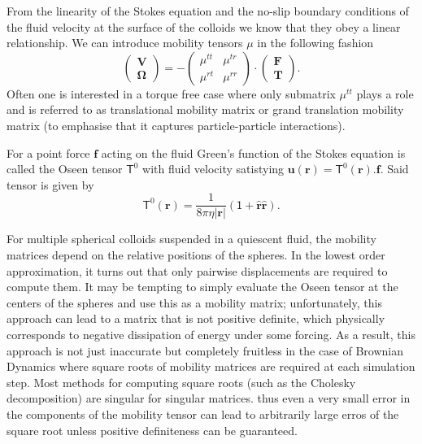 \documentclass{doctoral}
\newcommand{\mm}[1]{\bm{\mathsf{#1}}} %
\begin{document}
From the linearity of the Stokes equation and the no-slip boundary conditions of the fluid velocity at the surface of the colloids we know that they obey a linear relationship.
We can introduce mobility tensors $\mm{\mu}$ in the following fashion
\begin{equation}
    \begin{pmatrix}
        \bm{V} \\
        \bm{\Omega}
    \end{pmatrix}
    = -
    \begin{pmatrix}
        \mm{\mu}^{tt} & \mm{\mu}^{tr} \\
        \mm{\mu}^{rt} & \mm{\mu}^{rr}
    \end{pmatrix}
    \cdot
    \begin{pmatrix}
        \bm{F} \\
        \bm{T}
    \end{pmatrix}
    .
    \label{eqn:mobility-matrix-definition}
\end{equation}
Often one is interested in a torque free case where only submatrix $\mm{\mu}^{tt}$ plays a role and is referred to as translational mobility matrix or grand translation mobility matrix (to emphasise that it captures particle-particle interactions).

For a point force $\bm{f}$ acting on the fluid Green's function of the Stokes equation is called the Oseen tensor $\mm{T}^0$ with fluid velocity satistying $\bm{u}(\bm{r}) = \mm{T}^{0}(\bm{r}).
    \bm{f}$.
Said tensor is given by
\begin{equation}
    \mm{T}^{0}(\bm{r}) = \frac{1}{8\pi\eta |\bm{r}|} \left( \mm{1} + \bm{\hat{r}}\bm{\hat{r}}\right).
\end{equation}

For multiple spherical colloids suspended in a quiescent fluid, the mobility matrices depend on the relative positions of the spheres.
In the lowest order approximation, it turns out that only pairwise displacements are required to compute them.
It may be tempting to simply evaluate the Oseen tensor at the centers of the spheres and use this as a mobility matrix; unfortunately, this approach can lead to a matrix that is not positive definite, which physically corresponds to negative dissipation of energy under some forcing.
As a result, this approach is not just inaccurate but completely fruitless in the case of Brownian Dynamics where square roots of mobility matrices are required at each simulation step.
Most methods for computing square roots (such as the Cholesky decomposition) are singular for singular matrices.
thus even a very small error in the components of the mobility tensor can lead to arbitrarily large erros of the square root unless positive definiteness can be guaranteed.
\end{document}
